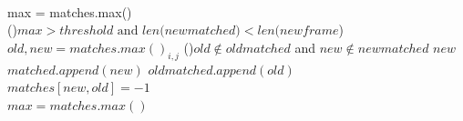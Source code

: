 \documentclass[11pt,twoside]{report}
\begin{document}
\texttt{\\}
max = matches.max() \texttt{\\}
\While(){$max > threshold \text{ and } len(new$\textunderscore$matched)<len(new$\textunderscore$frame$)}{
	$old,new = matches.max()_{i,j}$ 
	\uIf(){$old \notin old$\textunderscore$matched$ and $new \notin new$\textunderscore$matched$}{
		$new$\textunderscore$matched.append(new)$ 
		$old$\textunderscore$matched.append(old)$ 
	}
	\texttt{\\}
	$matches[new,old] = -1$ \texttt{\\}
	$max = matches.max()$
}




\end{document}

